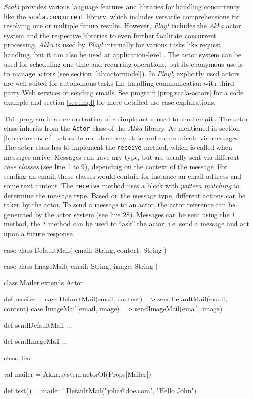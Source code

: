 \textit{Scala} provides various language features and libraries for handling concurrency like the \texttt{scala.concurrent} library, which includes versatile comprehensions for resolving one or multiple future results. However, \textit{Play!} includes the \textit{Akka} actor system and the respective libraries to even further facilitate concurrent processing. \textit{Akka} is used by \textit{Play!} internally for various tasks like request handling, but it can also be used at application-level \cite[p. 83]{Scala}. The actor system can be used for scheduling one-time and recurring operations, but its eponymous use is to manage actors (see section \ref{lab:actormodel}). In \textit{Play!}, explicitly used actors are well-suited for autonomous tasks like handling communication with third-party Web services or sending emails. See program \ref{prog:scala-actors} for a code example and section \ref{sec:impl} for more detailed use-case explanations.

\begin{program}
  \caption{This program is a demonstration of a simple actor used to send emails. The actor class inherits from the \texttt{Actor} class of the \textit{Akka} library. As mentioned in section \ref{lab:actormodel}, actors do not share any state and communicate via messages. The actor class has to implement the \texttt{receive} method, which is called when messages arrive. Messages can have any type, but are usually sent via different \textit{case classes} (see line 1 to 9), depending on the context of the message. For sending an email, these classes would contain for instance an email address and some text content. The \texttt{receive} method uses a block with \textit{pattern matching} to determine the message type. Based on the message type, different actions can be taken by the actor. To send a message to an actor, the actor reference can be generated by the actor system (see line 28). Messages can be sent using the \texttt{!} method, the \texttt{?} method can be used to ``ask'' the actor, i.e. send a message and act upon a future response.}
  \label{prog:scala-actors}
  \begin{JavaCode}
case class DefaultMail(
    email: String,
    content: String
)

case class ImageMail(
    email: String,
    image: String
)

class Mailer extends Actor {
    
    def receive = {
        case DefaultMail(email, content) =>
            sendDefaultMail(email, content)
        case ImageMail(email, image) =>
            sendImageMail(email, image)
    }

    def sendDefaultMail ...

    def sendImageMail ...

}

class Test {
    
    val mailer = Akka.system.actorOf(Props[Mailer])

    def test() = {
        mailer ! DefaultMail("john@doe.com", "Hello John")
    }

}
  \end{JavaCode}
\end{program}

